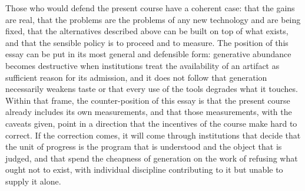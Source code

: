 \documentclass[11pt,a4paper]{article}
\theoremstyle{remark}
\begin{document}
Those who would defend the present course have a coherent case: that the gains are real, that the problems are the problems of any new technology and are being fixed, that the alternatives described above can be built on top of what exists, and that the sensible policy is to proceed and to measure. The position of this essay can be put in its most general and defensible form: generative abundance becomes destructive when institutions treat the availability of an artifact as sufficient reason for its admission, and it does not follow that generation necessarily weakens taste or that every use of the tools degrades what it touches. Within that frame, the counter-position of this essay is that the present course already includes its own measurements, and that those measurements, with the caveats given, point in a direction that the incentives of the course make hard to correct. If the correction comes, it will come through institutions that decide that the unit of progress is the program that is understood and the object that is judged, and that spend the cheapness of generation on the work of refusing what ought not to exist, with individual discipline contributing to it but unable to supply it alone.
\end{document}
